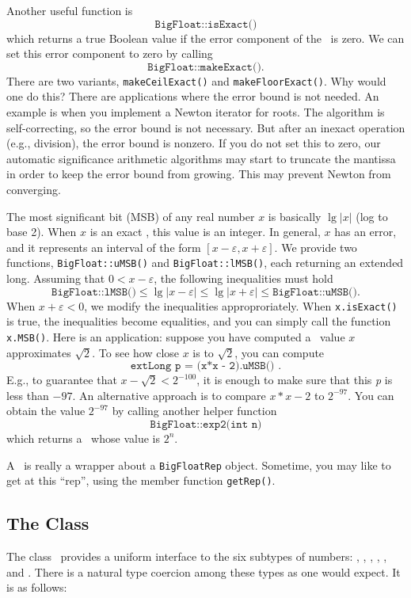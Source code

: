 Another useful function is
	$$\texttt{BigFloat::isExact()}$$
which returns a true Boolean value
if the error component of the \BF\ is zero.
We can set this error component to zero by calling
	$$\texttt{BigFloat::makeExact()}.$$
There are two variants, \texttt{makeCeilExact()} and
\texttt{makeFloorExact()}.  Why would one do this?
There are applications where the error bound is not needed.  
An example is when you implement a Newton iterator for roots.
The algorithm is self-correcting, so the error bound is
not necessary.  But after an inexact operation (e.g., division),
the error bound is nonzero.  If you do not set this to zero, our
automatic significance arithmetic algorithms
may start to truncate the mantissa in order to keep the error bound
from growing.  This may prevent Newton from converging.

The most significant bit (MSB) of
any real number $x$ is basically $\lg|x|$
(log to base 2).  When $x$ is an exact \BF, this value is an integer.
In general, $x$ has an error, and it represents an interval
of the form $[x-\varepsilon, x+\varepsilon]$.  We provide two functions,
\texttt{BigFloat::uMSB()} and \texttt{BigFloat::lMSB()},
each returning an extended long.  Assuming that $0< x-\varepsilon$, 
the following inequalities must hold
	$$ \texttt{BigFloat::lMSB()} \le \lg |x-\varepsilon|
		\le \lg | x+\varepsilon| \le \texttt{BigFloat::uMSB()}.$$
When $x+\varepsilon < 0$, we modify the inequalities approproriately.
When \texttt{x.isExact()} is true, the
inequalities become equalities, and
you can simply call the function \texttt{x.MSB()}.
Here is an application: suppose you have computed
a \BF\ value $x$ approximates $\sqrt{2}$.   To see
how close $x$ is to $\sqrt{2}$, you can compute
	$$\texttt{extLong p = (x*x - 2).uMSB() }.$$
E.g., to guarantee that $x- \sqrt{2}< 2^{-100}$, it is enough
to make sure that this \textit{p} is less than $-97$.
An alternative approach is to compare $x*x -2$ to $2^{-97}$.
You can obtain the value $2^{-97}$ by calling another helper function
	$$\texttt{BigFloat::exp2(int n)}$$
which returns a \BF\ whose value is $2^n$.

A \BF\ is really a wrapper about a \texttt{BigFloatRep} object.
Sometime, you may like to get at
this ``rep'', using the member function \texttt{getRep()}.

\subsection{The Class \real}
\label{sec-real-intro}
The class \real\ provides a uniform interface to the six subtypes of numbers:
\int, \lng, \double, \Int, \Rat, and \BF. 
There is a natural type coercion among these types as one would
expect. It is as follows:

